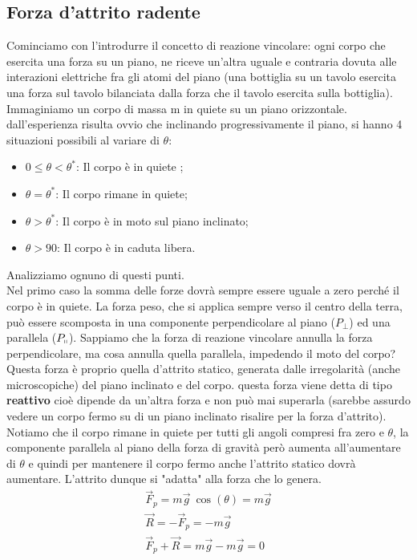 \documentclass[10pt,a4paper]{article}
\begin{document}
\subsection{Forza d'attrito radente}
Cominciamo con l'introdurre il concetto di reazione vincolare: ogni corpo che esercita una forza su un piano, ne riceve un'altra uguale e contraria dovuta alle interazioni elettriche fra gli atomi del piano (una bottiglia su un tavolo esercita una forza sul tavolo bilanciata dalla forza che il tavolo esercita sulla bottiglia).\\
Immaginiamo un corpo di massa m in quiete su un piano orizzontale. dall'esperienza risulta ovvio che inclinando progressivamente il piano, si hanno 4 situazioni possibili al variare di $\theta$:\\
\begin{itemize}
\item $0 \leq \theta < \theta^*$: Il corpo è in quiete ;
\item $\theta = \theta^*$: Il corpo rimane in quiete;
\item $\theta > \theta^*$: Il corpo è in moto sul piano inclinato;
\item $\theta > 90$\textdegree: Il corpo è in caduta libera.
\end{itemize}
Analizziamo ognuno di questi punti.\\
Nel primo caso la somma delle forze dovrà sempre essere uguale a zero perché il corpo è in quiete. La forza peso, che si applica sempre verso il centro della terra, può essere scomposta in una componente perpendicolare al piano ($P_\perp$) ed una parallela ($P_\shortparallel$). Sappiamo che la forza di reazione vincolare annulla la forza perpendicolare, ma cosa annulla quella parallela, impedendo il moto del corpo? Questa forza è proprio quella d'attrito statico, generata dalle irregolarità (anche microscopiche) del piano inclinato e del corpo. questa forza viene detta di tipo \textbf{reattivo} cioè dipende da un'altra forza e non può mai superarla (sarebbe assurdo vedere un corpo fermo su di un piano inclinato risalire per la forza d'attrito). Notiamo che il corpo rimane in quiete per tutti gli angoli compresi fra zero e $\theta$, la componente parallela al piano della forza di gravità però aumenta all'aumentare di $\theta$ e quindi per mantenere il corpo fermo anche l'attrito statico dovrà aumentare. L'attrito dunque si "adatta" alla forza che lo genera.  
\begin{align*}
\vec{F}_p= m\vec{g}\ \cos(\theta)=m\vec{g}\\
\vec{R}=-\vec{F}_p=-m\vec{g}\\
\vec{F}_p+\vec{R}= m\vec{g}-m\vec{g}=0
\end{align*}
\end{document}
